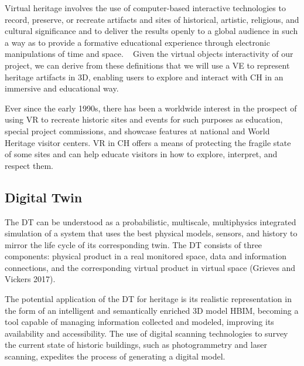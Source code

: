 Virtual heritage involves the use of computer-based interactive technologies to record, preserve, or recreate 
artifacts and sites of historical, artistic, religious, and cultural significance and to deliver 
the results openly to a global audience in such a way as to provide a formative educational 
experience through electronic manipulations of time and space. ~\cite{848434} Given the virtual objects interactivity of our project, we can derive from these definitions that we will use a \gls{VE} to represent heritage artifacts 
in \gls{3D}, enabling users to explore and interact with \gls{CH} in an immersive and educational way.

Ever since the early 1990s, there has been a worldwide interest in the prospect of using \gls{VR} to 
recreate historic sites and events for such purposes as education, special project commissions, 
and showcase features at national and World Heritage visitor centers. \gls{VR} in \gls{CH} offers a means of protecting the fragile state of some sites and can help educate visitors in how to explore, interpret, and respect them. ~\cite{hale2014handbook}




\subsection{Digital Twin}
\label{sec:digital_twin}


The \gls{DT} can be understood as a probabilistic, multiscale,
multiphysics integrated simulation of a system that uses the best physical models,
sensors, and history to mirror the life cycle of its corresponding twin. 
The \gls{DT} consists of three components: physical product in a real monitored
 space, data and information connections, and the corresponding virtual product
 in virtual space (Grieves and Vickers 2017).


 The potential application of the \gls{DT} for heritage is its realistic
 representation in the form of an intelligent and semantically enriched \gls{3D} model
\gls{HBIM}, becoming a tool capable of managing information collected and modeled,
 improving its availability and accessibility.
 The use of digital scanning technologies to survey the current state of historic
 buildings, such as photogrammetry and laser scanning, expedites the process
 of generating a digital model.~\cite{dezen2020towards}

